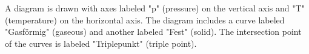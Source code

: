 A diagram is drawn with axes labeled "p" (pressure) on the vertical axis and "T" (temperature) on the horizontal axis. The diagram includes a curve labeled "Gasförmig" (gaseous) and another labeled "Fest" (solid). The intersection point of the curves is labeled "Triplepunkt" (triple point).